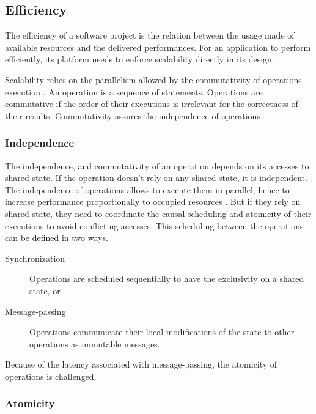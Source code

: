 \subsection{Efficiency} \label{chapter3:definitions:efficiency}

The efficiency of a software project is the relation between the usage made of available resources and the delivered performances.
For an application to perform efficiently, its platform needs to enforce scalability directly in its design.

Scalability relies on the parallelism allowed by the commutativity of operations execution \cite{Clements2013a}.
An operation is a sequence of statements.
Operations are commutative if the order of their executions is irrelevant for the correctness of their results.
Commutativity assures the independence of operations.

\subsubsection{Independence} \label{chapter3:definitions:efficiency:independence}

The independence, and commutativity of an operation depends on its accesses to shared state.
If the operation doesn't rely on any shared state, it is independent.
The independence of operations allows to execute them in parallel, hence to increase performance proportionally to occupied resources \cite{Amdahl1967,Gunther1993}.
But if they rely on shared state, they need to coordinate the causal scheduling and atomicity of their executions to avoid conflicting accesses.
This scheduling between the operations can be defined in two ways.
\begin{description}
\item[Synchronization] Operations are scheduled sequentially to have the exclusivity on a shared state, or
\item[Message-passing] Operations communicate their local modifications of the state to other operations as immutable messages.
\end{description}

Because of the latency associated with message-passing, the atomicity of operations is challenged.

\subsubsection{Atomicity} \label{chapter3:definitions:efficiency:atomicity}

